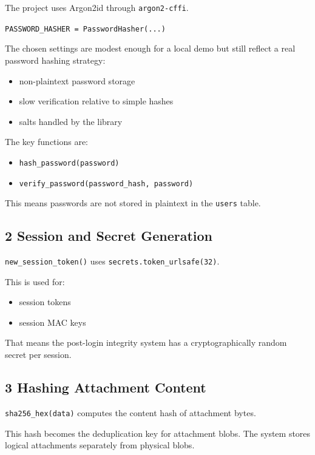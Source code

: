 \documentclass[11pt,a4paper]{article}
\begin{document}
The project uses Argon2id through \nolinkurl{argon2-cffi}.

\nolinkurl{PASSWORD_HASHER = PasswordHasher(...)}

The chosen settings are modest enough for a local demo but still reflect a real password hashing strategy:

\begin{itemize}
\item non-plaintext password storage
\item slow verification relative to simple hashes
\item salts handled by the library
\end{itemize}

The key functions are:

\begin{itemize}
\item \nolinkurl{hash_password(password)}
\item \nolinkurl{verify_password(password_hash, password)}
\end{itemize}

This means passwords are not stored in plaintext in the \nolinkurl{users} table.

\subsection{2 Session and Secret Generation}

\nolinkurl{new_session_token()} uses \nolinkurl{secrets.token_urlsafe(32)}.

This is used for:

\begin{itemize}
\item session tokens
\item session MAC keys
\end{itemize}

That means the post-login integrity system has a cryptographically random secret per session.

\subsection{3 Hashing Attachment Content}

\nolinkurl{sha256_hex(data)} computes the content hash of attachment bytes.

This hash becomes the deduplication key for attachment blobs. The system stores logical attachments separately from physical blobs.
\end{document}
